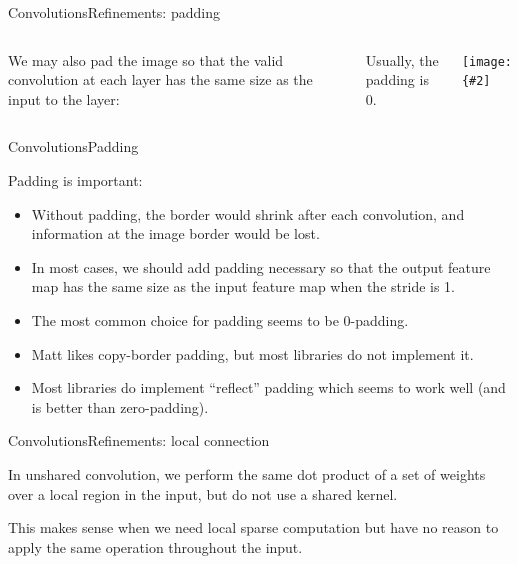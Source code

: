 \documentclass[aspectratio=169]{beamer}
\newcommand{\myfig}[3]{\centerline{\texttt{[image: \{\#2]}}}
\begin{document}
\begin{frame}{Convolutions}{Refinements: padding}

  \begin{columns}

    \column{1.5in}
    
    We may also \alert{pad} the image so that the valid convolution at
    each layer has the same size as the input to the layer:

    \medskip
    
    Usually, the padding is 0.

    \column{3in}
    
    \myfig{2.5in}{goodfellow-fig9-13}{Goodfellow et al. (2016), Figure 9.13}

  \end{columns}

\end{frame}


\begin{frame}{Convolutions}{Padding}

  Padding is important:
  \begin{itemize}
  \item Without padding, the border would shrink after each
    convolution, and information at the image border would be lost.
  \item In most cases, we should add padding necessary so that the
    output feature map has the same size as the input feature map when
    the stride is 1.
  \item The most common choice for padding seems to be 0-padding.
  \item Matt likes copy-border padding, but most libraries do not implement it.
  \item Most libraries do implement ``reflect'' padding which seems to
    work well (and is better than zero-padding).
  \end{itemize}
  
\end{frame}


\begin{frame}{Convolutions}{Refinements: local connection}

In \alert{unshared convolution}, we perform the same dot product of a
set of weights over a local region in the input, but do not use a shared
kernel.

\medskip

This makes sense when we need local sparse computation but have
no reason to apply the same operation throughout the input.

\end{frame}
\end{document}
